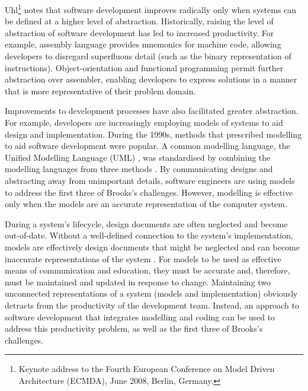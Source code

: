 Uhl\footnote{Keynote address to the Fourth European Conference on Model Driven Architecture (ECMDA), June 2008, Berlin, Germany.} notes that software development improves radically only when systems can be defined at a higher level of abstraction. Historically, raising the level of abstraction of software development has led to increased productivity. For example, assembly language provides mnemonics for machine code, allowing developers to disregard superfluous detail (such as the binary representation of instructions). Object-orientation and functional programming permit further abstraction over assembler, enabling developers to express solutions in a manner that is more representative of their problem domain.

Improvements to development processes have also facilitated greater abstraction. For example, developers are increasingly employing models of systems to aid design and implementation. During the 1990s, methods that prescribed modelling to aid software development were popular. A common modelling language, the Unified Modelling Language (UML) \cite{uml212}, was standardised by combining the modelling languages from three methods \cite{}. By communicating designs and abstracting away from unimportant details, software engineers are using models to address the first three of Brooks's challenges. However, modelling is effective only when the models are an accurate representation of the computer system.

During a system's lifecycle, design documents are often neglected and become out-of-date. Without a well-defined connection to the system's implementation, models are effectively design documents that might be neglected and can become inaccurate representations of the system \cite{frankel02mda,kleppe03mda}. For models to be used as effective means of communication and education, they must be accurate and, therefore, must be maintained and updated in response to change. Maintaining two unconnected representations of a system (models and implementation) obviously detracts from the productivity of the development team. Instead, an approach to software development that integrates modelling and coding can be used to address this productivity problem, as well as the first three of Brooks's challenges.








